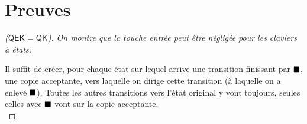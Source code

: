 \documentclass[12pt, a4paper]{article}
\begin{document}
    
    \clearpage


    \appendix
    \section{Preuves}
    \begin{proof}[($\mathsf{QEK} = \mathsf{QK}$)]
        \emph{On montre que la touche entrée peut être négligée pour les claviers à états.} 

        Il suffit de créer, pour chaque état sur lequel arrive une transition finissant par $\mathord{\blacksquare}$, une copie acceptante, vers laquelle on dirige cette transition (à laquelle on a enlevé $\mathord{\blacksquare}$).
        Toutes les autres transitions vers l'état original y vont toujours, seules celles avec $\mathord{\blacksquare}$ vont sur la copie acceptante. \medskip \\
    \end{proof}
\end{document}
